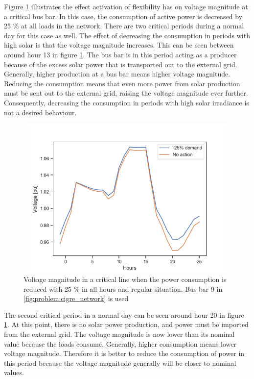 \documentclass[class=book, crop=false]{standalone}
\begin{document}
Figure \ref{fig:results:decrease_demand_voltage} illustrates the effect activation of flexibility has on voltage magnitude at a critical bus bar. In this case, the consumption of active power is decreased by 25 \% at all loads in the network. There are two critical periods during a normal day for this case as well. The effect of decreasing the consumption in periods with high solar is that the voltage magnitude increases. This can be seen between around hour 13 in figure \ref{fig:results:decrease_demand_voltage}. The bus bar is in this period acting as a producer because of the excess solar power that is transported out to the external grid. Generally, higher production at a bus bar means higher voltage magnitude. Reducing the consumption means that even more power from solar production must be sent out to the external grid, raising the voltage magnitude ever further. Consequently, decreasing the consumption in periods with high solar irradiance is not a desired behaviour. 

\begin{figure}[ht]
    \center
\includegraphics[height=8cm, width=12cm]{figures/decrease_demand_voltage.png}
    \caption[size = 9]{Voltage magnitude in a critical line when the power consumption is reduced with 25 \% in all hours and regular situation. Bus bar 9 in \ref{fig:problem:cigre_network} is used}
    \label{fig:results:decrease_demand_voltage}
\end{figure}
The second critical period in a normal day can be seen around hour 20 in figure \ref{fig:results:decrease_demand_voltage}. At this point, there is no solar power production, and power must be imported from the external grid. The voltage magnitude is now lower than its nominal value because the loads consume. Generally, higher consumption means lower voltage magnitude. Therefore it is better to reduce the consumption of power in this period because the voltage magnitude generally will be closer to nominal values.
\end{document}
